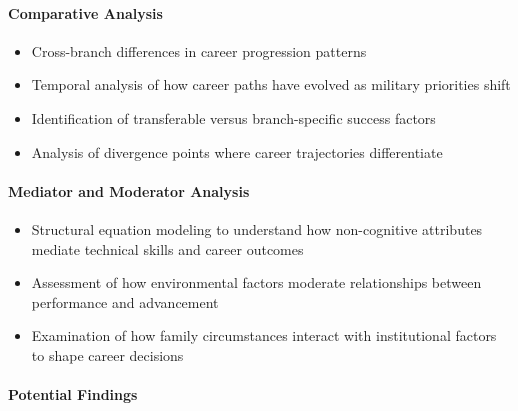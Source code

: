 \documentclass[./main.tex]{subfiles}
\begin{document}
\paragraph{Comparative Analysis}\label{comparative-analysis}

\begin{itemize}
\tightlist
\item
  Cross-branch differences in career progression patterns
\item
  Temporal analysis of how career paths have evolved as military
  priorities shift
\item
  Identification of transferable versus branch-specific success factors
\item
  Analysis of divergence points where career trajectories differentiate
\end{itemize}

\paragraph{Mediator and Moderator
Analysis}\label{mediator-and-moderator-analysis}

\begin{itemize}
\tightlist
\item
  Structural equation modeling to understand how non-cognitive
  attributes mediate technical skills and career outcomes
\item
  Assessment of how environmental factors moderate relationships between
  performance and advancement
\item
  Examination of how family circumstances interact with institutional
  factors to shape career decisions
\end{itemize}

\paragraph{Potential Findings}\label{potential-findings}
\end{document}
